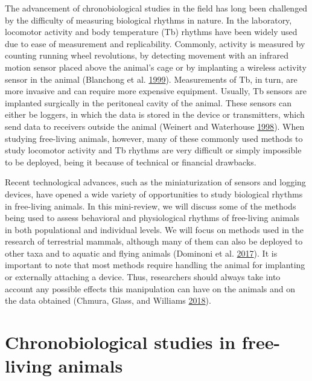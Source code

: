 \documentclass[msc,numbers,hidelinks]{coppe}
\begin{document}
  The advancement of chronobiological studies in the field has long been challenged by the difficulty of measuring biological rhythms in nature. In the laboratory, locomotor activity and body temperature (Tb) rhythms have been widely used due to ease of measurement and replicability. Commonly, activity is measured by counting running wheel revolutions, by detecting movement with an infrared motion sensor placed above the animal's cage or by implanting a wireless activity sensor in the animal (Blanchong et al. \protect\hyperlink{ref-blanchongNocturnalDiurnalRhythms1999}{1999}). Measurements of Tb, in turn, are more invasive and can require more expensive equipment. Usually, Tb sensors are implanted surgically in the peritoneal cavity of the animal. These sensors can either be loggers, in which the data is stored in the device or transmitters, which send data to receivers outside the animal (Weinert and Waterhouse \protect\hyperlink{ref-weinertDiurnallyChangingEffects1998}{1998}). When studying free-living animals, however, many of these commonly used methods to study locomotor activity and Tb rhythms are very difficult or simply impossible to be deployed, being it because of technical or financial drawbacks.

  Recent technological advances, such as the miniaturization of sensors and logging devices, have opened a wide variety of opportunities to study biological rhythms in free-living animals. In this mini-review, we will discuss some of the methods being used to assess behavioral and physiological rhythms of free-living animals in both populational and individual levels. We will focus on methods used in the research of terrestrial mammals, although many of them can also be deployed to other taxa and to aquatic and flying animals (Dominoni et al. \protect\hyperlink{ref-dominoniMethodsFieldChronobiology2017}{2017}). It is important to note that most methods require handling the animal for implanting or externally attaching a device. Thus, researchers should always take into account any possible effects this manipulation can have on the animals and on the data obtained (Chmura, Glass, and Williams \protect\hyperlink{ref-chmuraBiologgingPhysiologicalEcological2018}{2018}).

  \hypertarget{chronobiological-studies-in-free-living-animals}{%
  \section{Chronobiological studies in free-living animals}\label{chronobiological-studies-in-free-living-animals}}
\end{document}
